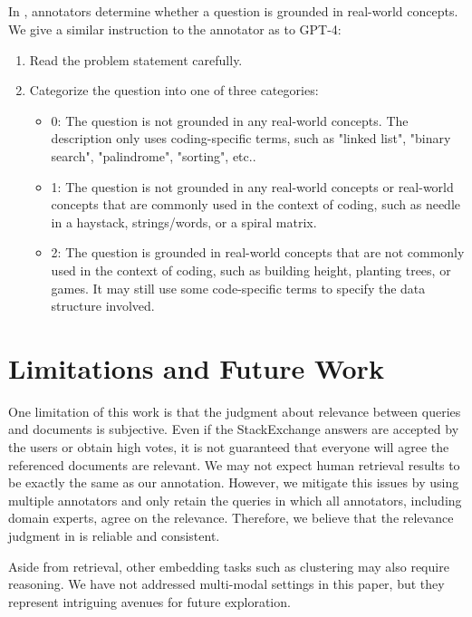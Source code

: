 \subsection{\leetcode}
In \leetcode, annotators determine whether a question is grounded in real-world concepts.
We give a similar instruction to the annotator as to GPT-4:
\begin{enumerate}
    \item Read the problem statement carefully.
    \item Categorize the question into one of three categories:
    \begin{itemize}
        \item 0: The question is not grounded in any real-world concepts. The description only uses coding-specific terms, such as "linked list", "binary search", "palindrome", "sorting", etc..
        \item 1: The question is not grounded in any real-world concepts or real-world concepts that are commonly used in the context of coding, such as needle in a haystack, strings/words, or a spiral matrix.
        \item 2: The question is grounded in real-world concepts that are not commonly used in the context of coding, such as building height, planting trees, or games. It may still use some code-specific terms to specify the data structure involved.
    \end{itemize}
\end{enumerate}



\section{Limitations and Future Work}
\label{app:limitation}
One limitation of this work is that the judgment about relevance between queries and documents is subjective.
Even if the StackExchange answers are accepted by the users or obtain high votes, it is not guaranteed that everyone will agree the referenced documents are relevant.
We may not expect human retrieval results to be exactly the same as our annotation.
However, we mitigate this issues by using multiple annotators and only retain the queries in which all annotators, including domain experts, agree on the relevance.
Therefore, we believe that the relevance judgment in \ours is reliable and consistent.

Aside from retrieval, other embedding tasks such as clustering may also require reasoning. We have not addressed multi-modal settings in this paper, but they represent intriguing avenues for future exploration.

